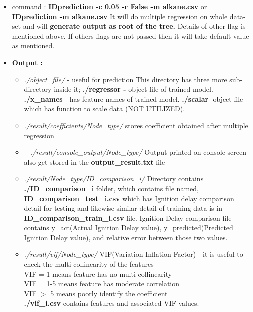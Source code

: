 \documentclass[12pt]{article}
\begin{document}
\begin{itemize}[wide = 0pt, labelwidth = 1.3333em, labelsep = 0.3333em, leftmargin = \dimexpr{} + \relax ]
			\begin{itemize}		
				\item command : \textbf{IDprediction -c 0.05 -r False -m alkane.csv} 
 \subsubitem \hspace{0.5cm} or \textbf{IDprediction -m alkane.csv} 
				\subitem It will do multiple regression on whole data-set and  will \textbf{generate output as root of the tree.} Details of other flag is mentioned above. If others flags are not passed then it will take default value as mentioned. \\
				
				\item \textbf{Output :}
				\begin{itemize}
					\item \textit{ ./object\_file/} - useful for prediction  
					\subitem  This directory has three more sub-directory inside it; \textbf{./regressor -} object file of trained model. \textbf{./x\_names} - has feature names of trained model. \textbf{./scalar}- object file which has function to scale data (NOT UTILIZED). 
					
					\item \textit{ ./result/coefficients/Node\_type/}
					\subitem  stores coefficient obtained after multiple regression  \\
					
					\item \textit{-- ./result/console\_output/Node\_type/}
					\subitem  Output printed on console screen also get stored in the \textbf{output\_result.txt} file \\
					
					\item \textit{ ./result/Node\_type/ID\_comparison\_i/}
					\subitem Directory contains \textbf{./ID\_comparison\_i} folder, which contains file named,
					\textbf{ID\_comparison\_test\_i.csv} which has Ignition delay comparison detail for testing and likewise similar detail of training data is in \textbf{ID\_comparison\_train\_i.csv} file. Ignition Delay comparison file contains y\_act(Actual Ignition Delay value), y\_predicted(Predicted Ignition Delay value), and relative error between those two values.\\
					
					\item \textit{ ./result/vif/Node\_type/}
					\subitem VIF(Variation Inflation Factor) - it is useful to  check the multi-collinearity of the features \\
					VIF = 1 means feature has no multi-collinearity  \\
					VIF = 1-5 means feature has moderate correlation  \\
					VIF $>$ 5  means poorly identify the coefficient \\
					\textbf{./vif\_i.csv} contains features and associated VIF values. \\
					

\end{itemize}
\end{itemize}
\end{itemize}
\end{document}
